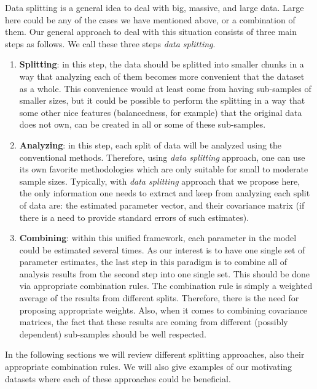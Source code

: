 \documentclass[11pt,a5paper,twoside]{book}
\begin{document}
Data splitting is a general idea to deal with big, massive, and large data. Large here could be any of the cases we have mentioned above, or a combination of them. Our general approach to deal with this situation consists of three main steps as follows. We call these three steps \textit{data splitting}.

\begin{enumerate}
\item \textbf{Splitting}: in this step, the data should be splitted into smaller chunks in a way that analyzing each of them becomes more convenient that the dataset as a whole. This convenience would at least come from having sub-samples of smaller sizes, but it could be possible to perform the splitting in a way that some other nice features (balancedness, for example) that the original data does not own, can be created in all or some of these sub-samples.

\item \textbf{Analyzing}: in this step, each split of data will be analyzed using the conventional methods. Therefore, using \emph{data splitting} approach, one can use its own favorite methodologies which are only suitable for small to moderate sample sizes. Typically, with \emph{data splitting} approach that we propose here, the only information one needs to extract and keep from analyzing each split of data are: the estimated parameter vector, and their covariance matrix (if there is a need to provide standard errors of such estimates).

\item \textbf{Combining}: within this unified framework, each parameter in the model could be estimated several times. As our interest is to have one single set of parameter estimates, the last step in this paradigm is to combine all of analysis results from the second step into one single set. This should be done via appropriate combination rules. The combination rule is simply a weighted average of the results from different splits. Therefore, there is the need for proposing appropriate weights. Also, when it comes to combining covariance matrices, the fact that these results are coming from different (possibly dependent) sub-samples should be well respected. 

\end{enumerate}



In the following sections we will review different splitting approaches, also their appropriate combination rules. We will also give examples of our motivating datasets where each of these approaches could be beneficial. 
\end{document}

